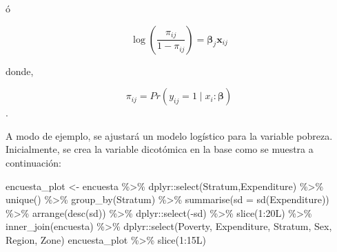 \documentclass[
  12pt,
]{book}
\newenvironment{Shaded}{\begin{snugshade}}{\end{snugshade}}
\newcommand{\AttributeTok}[1]{\textcolor[rgb]{0.77,0.63,0.00}{#1}}
\newcommand{\DecValTok}[1]{\textcolor[rgb]{0.00,0.00,0.81}{#1}}
\newcommand{\FunctionTok}[1]{\textcolor[rgb]{0.00,0.00,0.00}{#1}}
\newcommand{\NormalTok}[1]{#1}
\newcommand{\OtherTok}[1]{\textcolor[rgb]{0.56,0.35,0.01}{#1}}
\newcommand{\SpecialCharTok}[1]{\textcolor[rgb]{0.00,0.00,0.00}{#1}}
\begin{document}
ó

\[
\log\left(\frac{\pi_{ij}}{1-\pi_{ij}}\right)=\boldsymbol{\beta}_{j}\boldsymbol{x}_{ij}
\]

donde,

\[
\pi_{ij}=Pr\left(y_{ij}=1\mid x_{i}:\boldsymbol{\beta}\right)
\].

A modo de ejemplo, se ajustará un modelo logístico para la variable pobreza. Inicialmente, se crea la variable dicotómica en la base como se muestra a continuación:

\begin{Shaded}
\begin{Highlighting}[]
\NormalTok{encuesta\_plot }\OtherTok{\textless{}{-}}\NormalTok{ encuesta }\SpecialCharTok{\%\textgreater{}\%}
\NormalTok{  dplyr}\SpecialCharTok{::}\FunctionTok{select}\NormalTok{(Stratum,Expenditure) }\SpecialCharTok{\%\textgreater{}\%} \FunctionTok{unique}\NormalTok{() }\SpecialCharTok{\%\textgreater{}\%}
  \FunctionTok{group\_by}\NormalTok{(Stratum)  }\SpecialCharTok{\%\textgreater{}\%} 
  \FunctionTok{summarise}\NormalTok{(}\AttributeTok{sd =} \FunctionTok{sd}\NormalTok{(Expenditure)) }\SpecialCharTok{\%\textgreater{}\%} 
  \FunctionTok{arrange}\NormalTok{(}\FunctionTok{desc}\NormalTok{(sd)) }\SpecialCharTok{\%\textgreater{}\%}\NormalTok{ dplyr}\SpecialCharTok{::}\FunctionTok{select}\NormalTok{(}\SpecialCharTok{{-}}\NormalTok{sd) }\SpecialCharTok{\%\textgreater{}\%} 
  \FunctionTok{slice}\NormalTok{(}\DecValTok{1}\SpecialCharTok{:}\NormalTok{20L) }\SpecialCharTok{\%\textgreater{}\%}
  \FunctionTok{inner\_join}\NormalTok{(encuesta) }\SpecialCharTok{\%\textgreater{}\%}  
\NormalTok{  dplyr}\SpecialCharTok{::}\FunctionTok{select}\NormalTok{(Poverty, Expenditure, Stratum, }
\NormalTok{         Sex, Region, Zone) }
\NormalTok{encuesta\_plot }\SpecialCharTok{\%\textgreater{}\%} \FunctionTok{slice}\NormalTok{(}\DecValTok{1}\SpecialCharTok{:}\NormalTok{15L)}
\end{Highlighting}
\end{Shaded}
\end{document}
